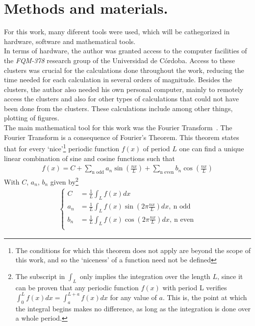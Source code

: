 \chapter{Methods and materials.}
\label{cha:met-mat}

For this work, many diferent tools were used, which will be cathegorized in hardware, software and mathematical tools. \\

In terms of hardware, the author was granted access to the computer facilities of the  \textit{FQM-378} research group of the Universidad de Córdoba. Access to these clusters was crucial for the calculations done throughout the work, reducing the time needed for each calculation in several orders of magnitude. Besides the clusters, the author also needed his own personal computer, mainly to remotely access the clusters and also for other types of calculations that could not have been done from the clusters. These calculations include among other things, plotting of figures.  \\

The main mathematical tool for this work was the Fourier Transform~\cite{FFT}. The Fourier Transform is a consequence of Fourier's Theorem. This theorem states that for every `nice'\footnote{The conditions for which this theorem does not apply are beyond the scope of this work, and so the `niceness' of a function need not be defined} periodic function $f(x)$ of period $L$ one can find a unique linear combination of sine and cosine functions such that 
\begin{align}
	f(x) = C + \sum_\text{n odd} a_n \sin\left( \frac{nx}{L} \right) + \sum_{\text{n even}}^{} b_n \cos \left( \frac{nx}{L} \right) 
\end{align}
With $C $, $a_n$, $b_n$ given by\footnote{The subscript in $\int_{L}^{} $ only implies the integration over the length $L$, since it can be proven that any periodic function $f(x)$ with period L verifies $ \int_{0}^{L} f(x)dx = \int_{a}^{L+a} f(x)dx $ for any value of $a$. This is, the point at which the integral begins makes no difference, as long as the integration is done over a whole period. }
\begin{align}
	\begin{cases}
		C &= \frac{1}{L} \int_{L}^{} f(x) dx\\
		a_n &= \frac{1}{L} \int_{L}^{} f(x) \sin\left(  2\pi \frac{nx}{L} \right) dx,~\text{n odd}\\
		b_n &= \frac{1}{L} \int_{L}^{} f(x) \cos\left(  2\pi \frac{nx}{L} \right) dx,~\text{n even}\\
	\end{cases}
\end{align}

